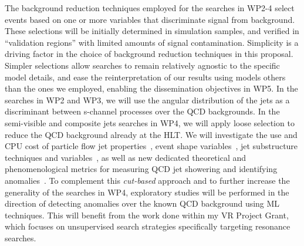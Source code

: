 The background reduction techniques employed for the searches in WP2-4 select events based on one or more variables that discriminate signal from background.
These selections will be initially determined in simulation samples, and verified in “validation regions” with limited amounts of signal contamination. 
Simplicity is a driving factor in the choice of background reduction techniques in this proposal. 
Simpler selections allow searches to remain relatively agnostic to the specific model details, and ease the reinterpretation of our results using models others than the ones we employed, enabling the dissemination objectives in WP5. 
In the searches in WP2 and WP3, we will use the angular distribution of the jets as a discriminant between s-channel processes over the QCD backgrounds. 
In the semi-visible and composite jets searches in WP4, we will apply loose selection to reduce the QCD background already at the HLT. 
We will investigate the use and CPU cost of particle flow jet properties~\cite{ToBeCited}, %
event shape variables~\cite{ToBeCited}, %
jet substructure techniques and variables~\cite{ToBeCited}, %
as well as new dedicated theoretical and phenomenological metrics for measuring QCD jet showering and identifying anomalies~\cite{ToBeCited}. %
To complement this \textit{cut-based} approach and to further increase the generality of the searches in WP4, exploratory studies will be performed in the direction of detecting anomalies over the known QCD background using ML techniques. %
This will benefit from the work done within my VR Project Grant, which focuses on unsupervised search strategies specifically targeting resonance searches.

